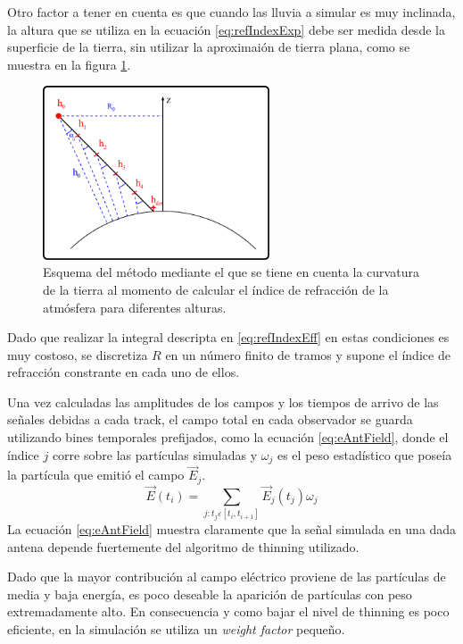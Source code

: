 		Otro factor a tener en cuenta es que cuando las lluvia a simular es muy inclinada, la altura que se utiliza en la ecuaci\'on \ref{eq:refIndexExp} debe ser medida desde la superficie de la tierra, sin utilizar la aproximai\'on de tierra plana, como se muestra en la figura \ref{fig:refIndex}.
		\begin{figure}[ht!]
		\centering
			\includegraphics[width=0.6\textwidth]{fig/simulacionRadio/refIndex}
			\caption{\label{fig:refIndex} Esquema del m\'etodo mediante el que se tiene en cuenta la curvatura de la tierra al momento de calcular el \'indice de refracci\'on de la atm\'osfera para diferentes alturas.}
		\end{figure}
		Dado que realizar la integral descripta en \ref{eq:refIndexEff} en estas condiciones es muy costoso, se discretiza $R$ en un n\'umero finito de tramos y supone el \'indice de refracci\'on constrante en cada uno de ellos.
		
		Una vez calculadas las amplitudes de los campos y los tiempos de arrivo de las se\~nales debidas a cada track, el campo total en cada observador se guarda utilizando bines temporales prefijados, como la ecuaci\'on \ref{eq:eAntField}, donde el \'indice $j$ corre sobre las part\'iculas simuladas y $\omega_j$ es el peso estad\'istico que pose\'ia la part\'icula que emiti\'o el campo $\vec{E}_j$.
		\begin{equation}
		\vec{E}(t_i)=\sum_{j:t_j\varepsilon[t_i,t_{i+1}]}\vec{E}_j(t_j)\omega_j
		\label{eq:eAntField}
		\end{equation}
		La ecuaci\'on \ref{eq:eAntField} muestra claramente que la se\~nal simulada en una dada antena depende fuertemente del algoritmo de thinning utilizado. 
		
		Dado que la mayor contribuci\'on al campo el\'ectrico proviene de las part\'iculas de media y baja energ\'ia, es poco deseable la aparici\'on de partículas con peso extremadamente alto.
		En consecuencia y como bajar el nivel de thinning es poco eficiente, en la simulación se utiliza un \emph{weight factor} peque\~no.

